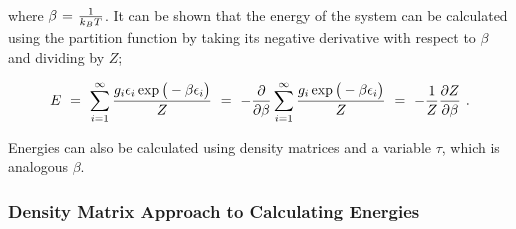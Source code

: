 \documentclass{ece}
\begin{document}
where \begin{math} \beta \hspace{0.025cm} = \hspace{0.025cm} \frac{1}{k_B T} \end{math}. It can be shown that the energy of the system can be calculated using the partition function by taking its negative derivative with respect to \begin{math} \beta \end{math} and dividing by \begin{math} Z \end{math};

\begin{equation} \label{eq:33}
E \hspace{0.125cm} = \hspace{0.125cm} \sum_{i = 1}^{\infty} \frac{g_i \epsilon_{i} \exp \big(- \beta \epsilon_i \big)}{Z} \hspace{0.125cm} = \hspace{0.125cm} - \frac{\partial}{\partial{\beta}}\sum_{i = 1}^{\infty} \frac{g_i \exp \big(- \beta \epsilon_i \big)}{Z} \hspace{0.125cm} = \hspace{0.125cm} - \frac{1}{Z} \frac{\partial Z}{\partial{\beta}}   \hspace{0.125cm} .
\end{equation}

Energies can also be calculated using density matrices and a variable \begin{math} \tau \end{math}, which is analogous \begin{math} \beta \end{math}.

\subsubsection{Density Matrix Approach to Calculating Energies}
\end{document}
